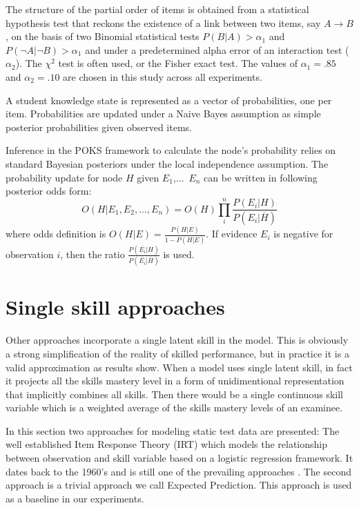 The structure of the partial order of items is obtained from a statistical hypothesis test that reckons the existence of a link between two items, say $A \rightarrow B$, on the basis of two Binomial statistical tests $P(B|A) > \alpha_1$ and $P(\neg A|\neg B) > \alpha_1$ and under a predetermined alpha error of an interaction test ($\alpha_2$).  The $\chi^2$ test is often used, or the Fisher exact test.  The values of $\alpha_1 = .85$ and $\alpha_2 = .10$ are chosen in this study across all experiments.

A student knowledge state is represented as a vector of probabilities, one per item.  Probabilities are updated under a Naive Bayes assumption as simple posterior probabilities given observed items.

Inference in the POKS framework to calculate the node's probability relies on standard Bayesian posteriors under the local independence assumption. The probability update for node $H$ given $E_1$,...~$E_n$ can be written in following posterior odds form:
\begin{equation}
O(H|E_1,E_2, ... , E_n) = O(H) \prod_{i}^{n} \frac{P(E_i|H)}{P(E_i | \overline{H})}
\label{EQPOKSratio}
\end{equation}
where odds definition is $O(H|E) = \frac{P(H|E)}{1-P(H|E)}$. If evidence $E_i$ is negative for observation $i$, then the ratio $\frac{P(\overline{E_i}|H)}{P(\overline{E_i}|\overline{H})}$ is used.

\section{Single skill approaches}

Other approaches incorporate a single latent skill in the model. This is obviously a strong simplification of the reality of skilled performance, but in practice it is a valid approximation as results show. When a model uses single latent skill, in fact it projects all the skills mastery level in a form of unidimentional representation that implicitly combines all skills. Then there would be a single continuous skill variable which is a weighted average of the skills mastery levels of an examinee. 

In this section two approaches for modeling static test data are presented: The well established Item Response Theory (IRT) which models the relationship between observation and skill variable based on a logistic regression framework. It dates back to the 1960's and is still one of the prevailing approaches \citep{bakerKim2004}.  The second approach is a trivial approach we call Expected Prediction. This approach is used as a baseline in our experiments.


